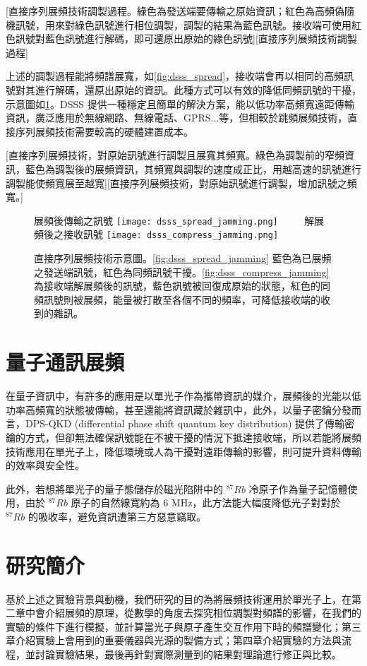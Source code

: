 \documentclass[class=NCU_thesis, crop=false]{standalone}
\begin{document}
[直接序列展頻技術調製過程。綠色為發送端要傳輸之原始資訊；紅色為高頻偽隨機訊號，用來對綠色訊號進行相位調製，調製的結果為藍色訊號。接收端可使用紅色訊號對藍色訊號進行解碼，即可還原出原始的綠色訊號][直接序列展頻技術調製過程]

上述的調製過程能將頻譜展寬，如\cref{fig:dsss_spread}，接收端會再以相同的高頻訊號對其進行解碼，還原出原始的資訊。此種方式可以有效的降低同頻訊號的干擾，示意圖如\cref{fig:dsss}。DSSS 提供一種穩定且簡單的解決方案，能以低功率高頻寬遠距傳輸資訊，廣泛應用於無線網路、無線電話、GPRS...等，但相較於跳頻展頻技術，直接序列展頻技術需要較高的硬體建置成本。

[直接序列展頻技術，對原始訊號進行調製且展寬其頻寬。綠色為調製前的窄頻資訊，藍色為調製後的展頻資訊，其頻寬與調製的速度成正比，用越高速的訊號進行調製能使頻寬展至越寬][直接序列展頻技術，對原始訊號進行調製，增加訊號之頻寬。]

\begin{figure}[!hbt]
    \centering
    \subcaptionbox
        {展頻後傳輸之訊號
        \label{fig:dsss_spread_jamming}}
        {\texttt{[image: dsss\_spread\_jamming.png]}}
    ~~~~
    \subcaptionbox
        {解展頻後之接收訊號
        \label{fig:dsss_compress_jamming}}
        {\texttt{[image: dsss\_compress\_jamming.png]}}
    \caption[直接序列展頻技術示意圖]{直接序列展頻技術示意圖。\cref{fig:dsss_spread_jamming} 藍色為已展頻之發送端訊號，紅色為同頻訊號干擾。\cref{fig:dsss_compress_jamming} 為接收端解展頻後的訊號，藍色訊號被回復成原始的狀態，紅色的同頻訊號則被展頻，能量被打散至各個不同的頻率，可降低接收端的收到的雜訊。}
    \label{fig:dsss}
\end{figure}

\section{量子通訊展頻}
在量子資訊中，有許多的應用是以單光子作為攜帶資訊的媒介，展頻後的光能以低功率高頻寬的狀態被傳輸，甚至還能將資訊藏於雜訊中\cite{belthangady2010hiding}，此外，以量子密鑰分發\cite{RevModPhys.74.145}而言，DPS-QKD (differential phase shift quantum key distribution)\cite{PhysRevLett.89.037902} 提供了傳輸密鑰的方式，但卻無法確保訊號能在不被干擾的情況下抵達接收端，所以若能將展頻技術應用在單光子上，降低環境或人為干擾對遠距傳輸的影響，則可提升資料傳輸的效率與安全性。

此外，若想將單光子的量子態儲存於磁光陷阱中的 $^{87}Rb$ 冷原子作為量子記憶體使用\cite{PhysRevLett.101.120501}，由於  $^{87}Rb$ 原子的自然線寬約為 6 MHz，此方法能大幅度降低光子對對於 $^{87}Rb$ 的吸收率，避免資訊遭第三方惡意竊取。

\section{研究簡介}
基於上述之實驗背景與動機，我們研究的目的為將展頻技術運用於單光子上，在第二章中會介紹展頻的原理，從數學的角度去探究相位調製對頻譜的影響，在我們的實驗的條件下進行模擬，並計算當光子與原子產生交互作用下時的頻譜變化；第三章介紹實驗上會用到的重要儀器與光源的製備方式；第四章介紹實驗的方法與流程，並討論實驗結果，最後再針對實際測量到的結果對理論進行修正與比較。
\end{document}
